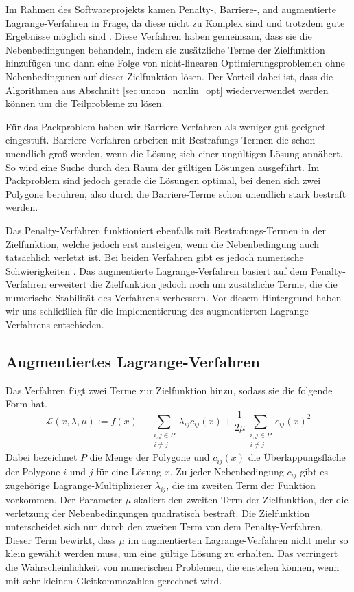 \documentclass[runningheads,a4paper]{llncs}
\begin{document}
Im Rahmen des Softwareprojekts kamen Penalty-, Barriere-, and augmentierte Lagrange-Verfahren in Frage, da diese nicht zu Komplex sind und trotzdem gute Ergebnisse möglich sind \cite{nocedal1999numerical}. Diese Verfahren haben gemeinsam, dass sie die Nebenbedingungen behandeln, indem sie zusätzliche Terme der Zielfunktion hinzufügen und dann eine Folge von nicht-linearen Optimierungsproblemen ohne Nebenbedingunen auf dieser Zielfunktion lösen. Der Vorteil dabei ist, dass die Algorithmen aus Abschnitt \ref{sec:uncon_nonlin_opt} wiederverwendet werden können um die Teilprobleme zu lösen.

Für das Packproblem haben wir Barriere-Verfahren als weniger gut geeignet eingestuft. Barriere-Verfahren arbeiten mit Bestrafungs-Termen die schon unendlich groß werden, wenn die Lösung sich einer ungültigen Lösung annähert. So wird eine Suche durch den Raum der gültigen Lösungen ausgeführt. Im Packproblem sind jedoch gerade die Lösungen optimal, bei denen sich zwei Polygone berühren, also durch die Barriere-Terme schon unendlich stark bestraft werden.

Das Penalty-Verfahren funktioniert ebenfalls mit Bestrafungs-Termen in der Zielfunktion, welche jedoch erst ansteigen, wenn die Nebenbedingung auch tatsächlich verletzt ist. Bei beiden Verfahren gibt es jedoch numerische Schwierigkeiten \cite{nocedal1999numerical}. Das augmentierte Lagrange-Verfahren basiert auf dem Penalty-Verfahren erweitert die Zielfunktion jedoch noch um zusätzliche Terme, die die numerische Stabilität des Verfahrens verbessern. Vor diesem Hintergrund haben wir uns schließlich für die Implementierung des augmentierten Lagrange-Verfahrens entschieden.

\subsection{Augmentiertes Lagrange-Verfahren}
Das Verfahren fügt zwei Terme zur Zielfunktion hinzu, sodass sie die folgende Form hat.
\begin{equation}
\label{eq:aug_lagrangian}
\mathcal{L}(x,\lambda,\mu) := f(x) - \sum_{\substack{i,j \in P \\ i\neq j}} \lambda_{ij} c_{ij}(x) + \frac{1}{2\mu}\sum_{\substack{i,j \in P \\ i\neq j}} c_{ij}(x)^2
\end{equation}
Dabei bezeichnet $P$ die Menge der Polygone und $c_{ij}(x)$ die Überlappungsfläche der Polygone $i$ und $j$ für eine Lösung $x$. Zu jeder Nebenbedingung $c_{ij}$ gibt es zugehörige Lagrange-Multiplizierer $\lambda_{ij}$, die im zweiten Term der Funktion vorkommen. Der Parameter $\mu$ skaliert den zweiten Term der Zielfunktion, der die verletzung der Nebenbedingungen quadratisch bestraft. Die Zielfunktion unterscheidet sich nur durch den zweiten Term von dem Penalty-Verfahren. Dieser Term bewirkt, dass $\mu$ im augmentierten Lagrange-Verfahren nicht mehr so klein gewählt werden muss, um eine gültige Lösung zu erhalten. Das verringert die Wahrscheinlichkeit von numerischen Problemen, die enstehen können, wenn mit sehr kleinen Gleitkommazahlen gerechnet wird.
\end{document}
